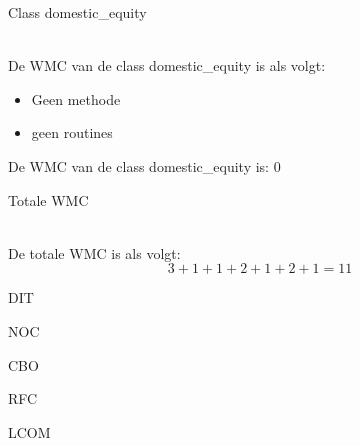 \documentclass[a4paper,titlepage]{artikel1}
\begin{document}
    \begin{bf}Class domestic\_equity\end{bf}\\
    De WMC van de class domestic\_equity is als volgt:
    \begin{itemize}
      \item Geen methode
      \item geen routines
    \end{itemize}
    De WMC van de class domestic\_equity is: 0 \\
    \begin{bf}Totale WMC\end{bf}\\
      De totale WMC is als volgt: \\
      \begin{displaymath}
        3 + 1 + 1 + 2 + 1 + 2 + 1 = 11
      \end{displaymath}
   \begin{center}\begin{bf}DIT\end{bf}\end{center}

   \begin{center}\begin{bf}NOC\end{bf}\end{center}

   \begin{center}\begin{bf}CBO\end{bf}\end{center}

   \begin{center}\begin{bf}RFC\end{bf}\end{center}

   \begin{center}\begin{bf}LCOM\end{bf}\end{center}
\end{document}
